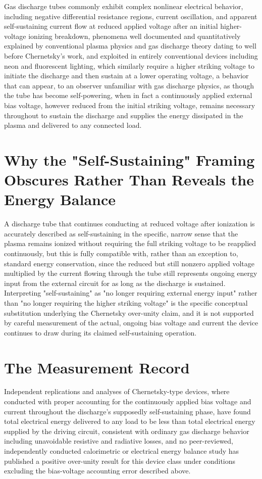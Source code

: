 \documentclass[11pt]{article}
\begin{document}
Gas discharge tubes commonly exhibit complex nonlinear electrical behavior, including negative differential resistance regions, current oscillation, and apparent self-sustaining current flow at reduced applied voltage after an initial higher-voltage ionizing breakdown, phenomena well documented and quantitatively explained by conventional plasma physics and gas discharge theory dating to well before Chernetsky's work, and exploited in entirely conventional devices including neon and fluorescent lighting, which similarly require a higher striking voltage to initiate the discharge and then sustain at a lower operating voltage, a behavior that can appear, to an observer unfamiliar with gas discharge physics, as though the tube has become self-powering, when in fact a continuously applied external bias voltage, however reduced from the initial striking voltage, remains necessary throughout to sustain the discharge and supplies the energy dissipated in the plasma and delivered to any connected load.

\section{Why the "Self-Sustaining" Framing Obscures Rather Than Reveals the Energy Balance}

A discharge tube that continues conducting at reduced voltage after ionization is accurately described as self-sustaining in the specific, narrow sense that the plasma remains ionized without requiring the full striking voltage to be reapplied continuously, but this is fully compatible with, rather than an exception to, standard energy conservation, since the reduced but still nonzero applied voltage multiplied by the current flowing through the tube still represents ongoing energy input from the external circuit for as long as the discharge is sustained. Interpreting "self-sustaining" as "no longer requiring external energy input" rather than "no longer requiring the higher striking voltage" is the specific conceptual substitution underlying the Chernetsky over-unity claim, and it is not supported by careful measurement of the actual, ongoing bias voltage and current the device continues to draw during its claimed self-sustaining operation.

\section{The Measurement Record}

Independent replications and analyses of Chernetsky-type devices, where conducted with proper accounting for the continuously applied bias voltage and current throughout the discharge's supposedly self-sustaining phase, have found total electrical energy delivered to any load to be less than total electrical energy supplied by the driving circuit, consistent with ordinary gas discharge behavior including unavoidable resistive and radiative losses, and no peer-reviewed, independently conducted calorimetric or electrical energy balance study has published a positive over-unity result for this device class under conditions excluding the bias-voltage accounting error described above.
\end{document}
